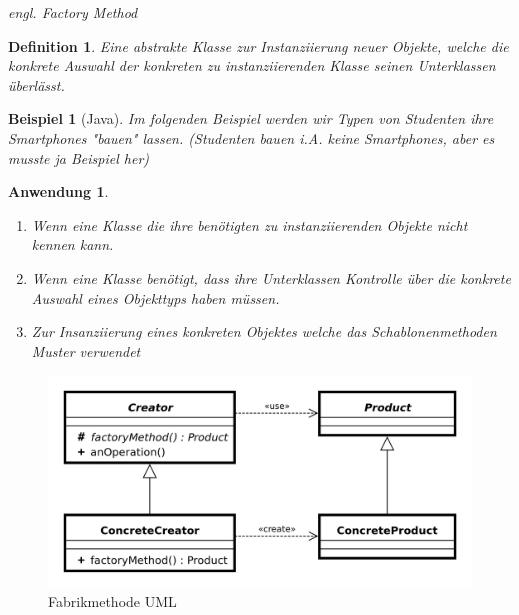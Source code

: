 \documentclass[a4paper]{article}
\theoremstyle{break}
\newtheorem{defi}{Definition}[section]
\newtheorem{ex}{Beispiel}[section]
\newtheorem{why}{Anwendung}[section]
\begin{document}
\textit{engl. Factory Method}

\begin{defi}
	Eine abstrakte Klasse zur Instanziierung neuer Objekte, welche die konkrete Auswahl der konkreten zu instanziierenden Klasse seinen Unterklassen überlässt.
\end{defi}

\begin{ex}[Java]
	Im folgenden Beispiel werden wir Typen von Studenten ihre Smartphones "bauen" lassen. (Studenten bauen i.A. keine Smartphones, aber es musste ja Beispiel her)

	
	
	
	
	
	
	
\end{ex}

\begin{why}
	\begin{enumerate}
		\item 	Wenn eine Klasse die ihre benötigten zu instanziierenden Objekte nicht kennen kann.
		\item Wenn eine Klasse benötigt, dass ihre Unterklassen Kontrolle über die konkrete Auswahl eines Objekttyps haben müssen.
		\item Zur Insanziierung eines konkreten Objektes welche das Schablonenmethoden Muster verwendet
	\end{enumerate}
\end{why}
\begin{figure}[H]
	\centering
	\includegraphics[width=\textwidth]{../diagrams/uml/FactoryMethodPattern.png}
	\caption{Fabrikmethode UML}
\end{figure}
\end{document}
